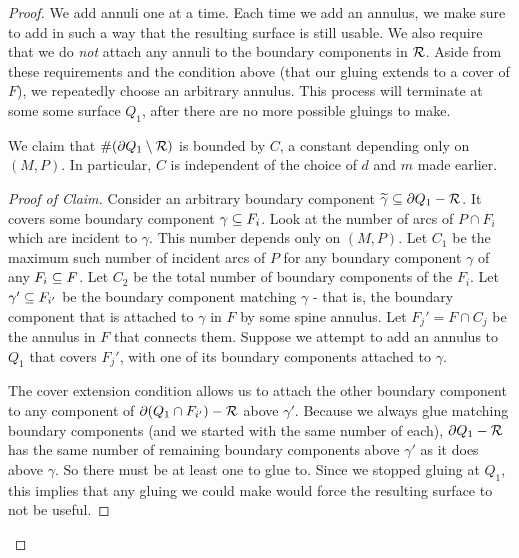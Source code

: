 \begin{proof}
We add annuli one at a time. Each time we add an annulus, we make sure to add
in such a way that the resulting surface is still usable. We also require that
we do \emph{not} attach any annuli to the boundary components in $\mathcal{R}$. Aside
from these requirements and the condition above (that our gluing extends to
a cover of $F$), we repeatedly choose an arbitrary annulus. This process will
terminate at some some surface $Q_1$, after there are no more possible gluings
to make.

\begin{claim}

We claim that $\#(\partial Q_1 \setminus \mathcal{R})$ is bounded by $C$, a constant
depending only on $(M,P)$. In particular, $C$ is independent of the choice of
$d$ and $m$ made earlier.

\end{claim}

\begin{proof}[Proof of Claim]

Consider an arbitrary boundary component $\widetilde{\gamma} \subseteq \partial Q_1
- \mathcal{R}$.  It covers some boundary component $\gamma \subseteq F_i$. Look at the
number of arcs of $P \cap F_i$ which are incident to $\gamma$. This number
depends only on $(M,P)$. Let $C_1$ be the maximum such number of incident arcs
of $P$ for any boundary component $\gamma$ of any $F_i \subseteq F$. Let $C_2$ be
the total number of boundary components of the $F_i$. Let $\gamma' \subseteq F_{i'}$
be the boundary component matching $\gamma$ - that is, the boundary component
that is attached to $\gamma$ in $F$ by some spine annulus. Let $F_j'= F \cap
C_j$ be the annulus in $F$ that connects them.  Suppose we attempt to add an
annulus to $Q_1$ that covers $F_j'$, with one of its boundary components
attached to $\gamma$.

The cover extension condition allows us to attach the other boundary component
to any component of $\partial(Q_1 \cap F_{i'}) - \mathcal{R}$ above $\gamma'$.  Because we
always glue matching boundary components (and we started with the same number
of each), $\partial Q_1 - \mathcal{R}$ has the same number of remaining boundary components
above $\gamma'$ as it does above $\gamma$. So there must be at least one to
glue to.  Since we stopped gluing at $Q_1$, this implies that any gluing we
could make would force the resulting surface to not be useful.


\end{proof}
\end{proof}
